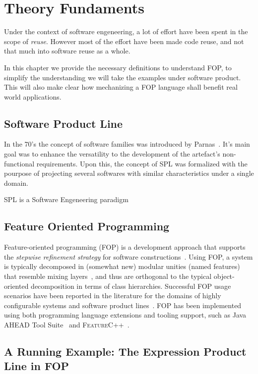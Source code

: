 \chapter{Theory Fundaments}
Under the context of software engeneering, a lot of effort have been spent in the scope of \textit{reuse}.
However most of the effort have been made code reuse, and not that much into software reuse as a whole.

In this chapter we provide the necessary definitions to understand \gls{FOP},
to simplify the understanding we will take the examples under software product.
This will also make clear how mechanizing a \gls{FOP} language shall benefit real world applications.


\section{Software Product Line}
In the 70's the concept of software families was introduced by Parnas~\cite{parnas1976design}. 
It's main goal was to enhance the versatility to the development of the artefact's 
non-functional requirements. Upon this, the concept of \gls{SPL}
was formalized with the pourpose of projecting several softwares
with similar characteristics under a single domain.

\gls{SPL} is a Software Engeneering paradigm 

\section{Feature Oriented Programming}\label{seq:fop}

Feature-oriented programming (FOP) is a development approach 
that supports the \emph{stepwise refinement strategy} for software 
constructions~\cite{batory-tse2004}. Using FOP, a system is 
typically decomposed in (somewhat new) modular unities 
(named features) that resemble mixing layers~\cite{bracha-ecoop1990}, 
and thus are orthogonal to the typical object-oriented 
decomposition in terms of class hierarchies. 
Successful FOP usage scenarios have been reported in the literature 
for the domains of highly configurable systems and
software product lines~\cite{}.  
FOP has been implemented using both programming 
language extensions and tooling support, such as 
Java AHEAD Tool Suite~\cite{batory_feature-oriented_2004} and \textsc{FeatureC++}~\cite{apel_featurec++:_2005}. 

\section{A Running Example: The Expression Product Line in \gls{FOP}}

